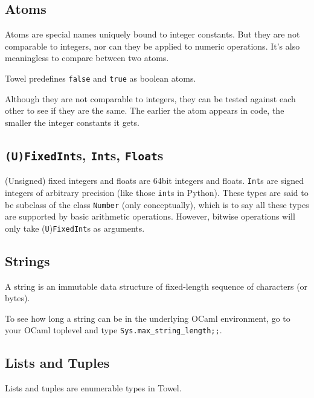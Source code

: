 \documentclass{report}
\begin{document}
\subsection{Atoms}

Atoms are special names uniquely bound to integer constants. But they are not comparable to integers, nor can they be applied to numeric operations. It's also meaningless to compare between two atoms.

Towel predefines \texttt{false} and \texttt{true} as boolean atoms.

\begin{mdframed}[style=detail]
Although they are not comparable to integers, they can be tested against each other to see if they are the same. The earlier the atom appears in code, the smaller the integer constants it gets.
\end{mdframed}

\subsection{\texttt{(U)FixedInt}s, \texttt{Int}s, \texttt{Float}s}

(Unsigned) fixed integers and floats are 64bit integers and floats. \texttt{Int}s are signed integers of arbitrary precision (like those \texttt{int}s in Python). These types are said to be subclass of the class \texttt{Number} (only conceptually), which is to say all these types are supported by basic arithmetic operations. However, bitwise operations will only take (\texttt{U})\texttt{FixedInt}s as arguments.

\subsection{Strings}

A string is an immutable data structure of fixed-length sequence of characters (or bytes).

\begin{mdframed}[style=detail]
  To see how long a string can be in the underlying OCaml environment, go to your OCaml toplevel and type \texttt{Sys.max\_string\_length;;}.
\end{mdframed}

\subsection{Lists and Tuples}

Lists and tuples are enumerable types in Towel.
\end{document}
